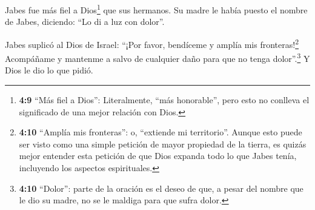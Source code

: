  Jabes fue más fiel a Dios\footnote{\textbf{4:9} ``Más
  fiel a Dios'': Literalmente, ``más honorable'', pero esto no conlleva
  el significado de una mejor relación con Dios.} que sus hermanos. Su
madre le había puesto el nombre de Jabes, diciendo: ``Lo di a luz con
dolor''.

 Jabes suplicó al Dios de Israel: ``¡Por favor, bendíceme
y amplía mis fronteras!\footnote{\textbf{4:10} ``Amplía mis fronteras'':
  o, ``extiende mi territorio''. Aunque esto puede ser visto como una
  simple petición de mayor propiedad de la tierra, es quizás mejor
  entender esta petición de que Dios expanda todo lo que Jabes tenía,
  incluyendo los aspectos espirituales.} Acompáñame y mantenme a salvo
de cualquier daño para que no tenga dolor''.\footnote{\textbf{4:10}
  ``Dolor'': parte de la oración es el deseo de que, a pesar del nombre
  que le dio su madre, no se le maldiga para que sufra dolor.} Y Dios le
dio lo que pidió.

